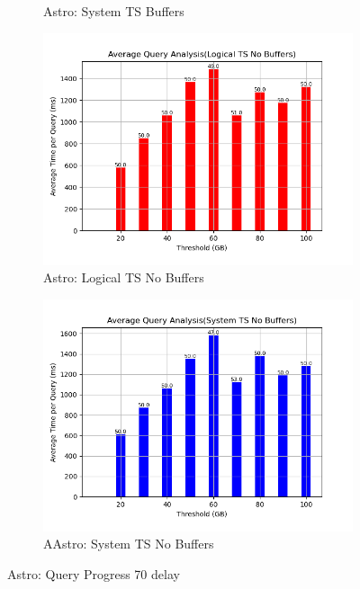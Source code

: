 \begin{figure}
\begin{subfigure}[c]{0.45\textwidth}
		\caption{Astro: System TS Buffers}
		\label{fig:system-ts-70-astro}
	\end{subfigure}
	\begin{subfigure}[c]{0.45\textwidth}
		\includegraphics[width=1\textwidth]	 {figures/Experiments/Dynamic/ASTRO/Batch_processing/70/average_query_time_per_batch_version_999777016_10485760_10_delay[70].png}
		\caption{Astro: Logical TS No Buffers}
		\label{fig:logical-ts-no-70-astro}
	\end{subfigure}
	\begin{subfigure}[c]{0.45\textwidth}
		\includegraphics[width=1\textwidth]	 {figures/Experiments/Dynamic/ASTRO/Batch_processing/70/average_query_time_per_batch_version_999777017_10485760_10_delay[70].png}
		\caption{AAstro: System TS No Buffers}
		\label{fig:system-ts-no-70-astro}
	\end{subfigure}
	\caption{Astro: Query Progress 70 delay}
	\label{fig:query-progress-70-astro}
\end{figure}


